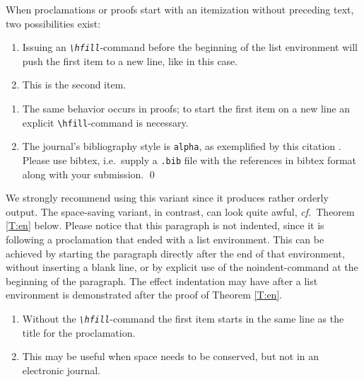 \documentclass{lmcs} %
\theoremstyle{plain}\newtheorem{satz}[thm]{Satz} %
\def\cf{{\em cf.}}
\begin{document}
  When proclamations or proofs start with an itemization without
  preceding text, two possibilities exist:

\begin{thm}\label{T:m}\hfill  %
\begin{enumerate}
\item
  Issuing an {\em\texttt{\textbackslash hfill}}-command before the
  beginning of the list environment will push the first item to a new
  line, like in this case.
\item
  This is the second item.
\end{enumerate}
\end{thm}

\proof\hfill  %
\begin{enumerate}
\item
  The same behavior occurs in proofs; to start the first item on a
  new line an explicit \texttt{\textbackslash hfill}-command is necessary.
\item
  The journal's bibliography style is \texttt{alpha}, as exemplified
  by this citation \cite{koslowski:mib}. Please use bibtex, i.e.\ supply a
  \verb|.bib| file with the references in bibtex format along with your submission. \qed
\end{enumerate}

  \noindent We strongly recommend using this variant since it produces
  rather orderly output.  The space-saving variant, in contrast, can
  look quite awful, \cf~Theorem \ref{T:en} below.  Please notice that
  this paragraph is not indented, since it is following a proclamation
  that ended with a list environment.  This can be achieved by
  starting the paragraph directly after the end of that environment,
  without inserting a blank line, or by explicit use of the
  noindent-command at the beginning of the paragraph.  The effect
  indentation may have after a list environment is demonstrated after
  the proof of Theorem \ref{T:en}.

\begin{thm}\label{T:en} %

\begin{enumerate}%
\item
  Without the \emph{\texttt{\textbackslash hfill}}-command the first item
  starts in the same line as the title for the proclamation.
\item
  This may be useful when space needs to be conserved, but not in an
  electronic journal.
\end{enumerate}
\end{thm}
\end{document}
